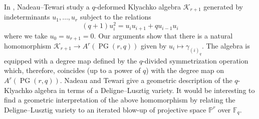 \documentclass[ALCO,published]{cedram}
\numberwithin{equation}{section}
\numberwithin{figure}{section}
\newcommand{\F}{\mathbb{F}}
\newcommand{\PP}{\mathbb{P}}
\newcommand{\cK}{\mathcal{K}}
\DeclareMathOperator{\PG}{PG}
\begin{document}
\begin{rema}
In \cite{NT:Klyachko}, Nadeau--Tewari study a $q$-deformed Klyachko algebra $\cK_{r+1}$ generated by indeterminants $u_1,\dots,u_r$ subject to the relations
\[(q+1)u_i^2=u_iu_{i+1}+qu_{i-1}u_{i}\]
where we take $u_0=u_{r+1}=0$. Our arguments show that there is a natural homomorphism $\cK_{r+1}\to A^r(\PG(r,q))$ given by $u_i\mapsto \gamma_{(i)_q}$. The algebra is equipped with a degree map defined by the $q$-divided symmetrization operation which, therefore, coincides (up to a power of $q$) with the degree map on $A^r(\PG(r,q))$.  Nadeau and Tewari \cite[Section~7]{NT:Klyachko} give a geometric description of the $q$-Klyachko algebra in terms of a Deligne--Lusztig variety. It would be interesting to find a geometric interpretation of the above homomorphism by relating the Deligne--Lusztig variety to an iterated blow-up of projective space $\PP^r$ over $\F_q$.
\end{rema}



\end{document}
